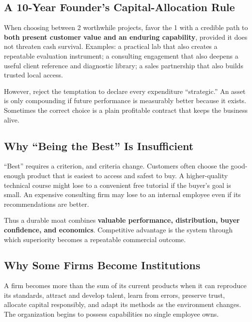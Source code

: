 \subsection{A 10-Year Founder's Capital-Allocation Rule}
\label{sec:ten_year_capital_allocation_rule}

When choosing between 2 worthwhile projects, favor the 1 with a credible path to \textbf{both present customer value and an enduring capability}, provided it does not threaten cash survival. Examples: a practical lab that also creates a repeatable evaluation instrument; a consulting engagement that also deepens a useful client reference and diagnostic library; a sales partnership that also builds trusted local access.

However, reject the temptation to declare every expenditure ``strategic.'' An asset is only compounding if future performance is measurably better because it exists. Sometimes the correct choice is a plain profitable contract that keeps the business alive.

\subsection{Why ``Being the Best'' Is Insufficient}
\label{sec:why_being_best_is_insufficient}

``Best'' requires a criterion, and criteria change. Customers often choose the good-enough product that is easiest to access and safest to buy. A higher-quality technical course might lose to a convenient free tutorial if the buyer's goal is small. An expensive consulting firm may lose to an internal employee even if its recommendations are better.

Thus a durable moat combines \textbf{valuable performance, distribution, buyer confidence, and economics}. Competitive advantage is the system through which superiority becomes a repeatable commercial outcome.

\subsection{Why Some Firms Become Institutions}
\label{sec:why_some_firms_become_institutions}

A firm becomes more than the sum of its current products when it can reproduce its standards, attract and develop talent, learn from errors, preserve trust, allocate capital responsibly, and adapt its methods as the environment changes. The organization begins to possess capabilities no single employee owns.

